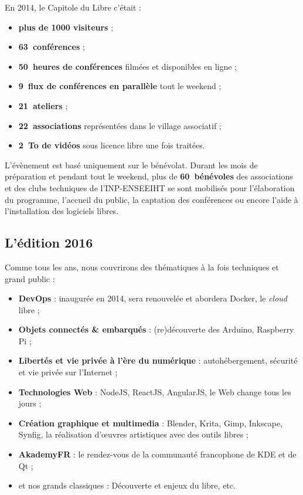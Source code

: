 \begin{minipage}{0.6\textwidth}
En 2014, le Capitole du Libre c'était :
\begin{itemize}[label=$\bullet$]
\item \textbf{plus de \num{1000} visiteurs} ;
\item \textbf{63~conférences} ;
\item \textbf{50~heures de conférences} filmées et disponibles en ligne ;
\item \textbf{9~flux de conférences en parallèle} tout le weekend ;
\item \textbf{21~ateliers} ;
\item \textbf{22~associations} représentées dans le village associatif ;
\item \textbf{\SI{2}{\tera o} de vidéos} sous licence libre une fois traitées.
\end{itemize}
\end{minipage}
\begin{minipage}{0.4\textwidth}
\begin{center}
\end{center}
\end{minipage}

\Separateur

L’évènement est basé uniquement sur le bénévolat.
 Durant les mois de préparation et pendant tout le weekend,
 plus de \textbf{60~bénévoles} des associations et des clubs techniques
 de l’INP-ENSEEIHT se sont mobilisés pour l’élaboration du programme,
 l’accueil du public, la captation des conférences ou encore l’aide
 à l’installation des logiciels libres.


\subsection{L'édition 2016}

Comme tous les ans, nous couvrirons des thématiques à la fois techniques et grand 
public :

\begin{itemize}[label=$\bullet$]
\item \textbf{DevOps} : inaugurée en 2014, sera renouvelée et abordera Docker, le \textit{cloud} libre ;
\item \textbf{Objets connectés \& embarqués} : (re)découverte des Arduino, Raspberry Pi ;
\item \textbf{Libertés et vie privée à l'ère du numérique} : autohébergement, sécurité et vie privée sur l’Internet ;
\item \textbf{Technologies Web} : NodeJS, ReactJS, AngularJS, le Web change tous les jours ;
\item \textbf{Création graphique et multimedia} : Blender, Krita, Gimp, Inkscape, Synfig, la réalisation d'œuvres artistiques avec des outils libres ;
\item \textbf{AkademyFR} : le rendez-vous de la communauté francophone de KDE et de Qt ;
\item et nos grands classiques : Découverte et enjeux du libre, etc.
\end{itemize}

